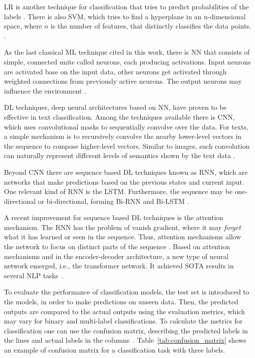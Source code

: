 \gls{LR} is another technique for classification that tries to predict probabilities of the labels \cite{Morgan1988}. There is also \gls{SVM}, which tries to find a hyperplane in an n-dimensional space, where $n$ is the number of features, that distinctly classifies the data points.
\cite{Cortes1995}. 

As the last classical \gls{ML} technique cited in this work, there is \gls{NN} that consists of simple, connected units called neurons, each producing activations. Input neurons are activated base on the input data, other neurons get activated through weighted connections from previously active neurons. The output neurons may influence the environment  \cite{Schmidhuber2015}. 

\gls{DL} techniques, deep neural architectures based on \gls{NN}, have proven to be effective in text classification. Among the techniques available there is \gls{CNN}, which uses convolutional masks to sequentially convolve over the data. For texts, a simple mechanism is to recursively convolve the nearby lower-level vectors in the sequence to compose higher-level vectors. Similar to images, such convolution can naturally represent different levels of semantics shown by the text data \cite{Peng2018}. 

Beyond \gls{CNN} there are sequence based \gls{DL} techniques known as \gls{RNN}, which are networks that make predictions based on the previous states and current input. One relevant kind of \gls{RNN} is the  \gls{LSTM}. Furthermore, the sequence may be one-directional or bi-directional, forming Bi-RNN and Bi-LSTM \cite{Kowsari2019, Hochreiter1997}. 

A recent improvement for sequence based \gls{DL} techniques is the attention mechanism. The \gls{RNN} has the problem of vanish gradient, where it may \textit{forget} what it has learned or seen in the sequence. Thus, attention mechanisms allow the network to focus on distinct parts of the sequence  \cite{Schmidhuber2015}. 
Based on attention mechanisms and in the encoder-decoder architecture, a new type of neural network emerged, i.e., the transformer network. It achieved \gls{SOTA} results in several \gls{NLP} tasks~\cite{Vaswani2017}.

To evaluate the performance of classification models,  the test set is introduced to the models, in order to make  predictions on  unseen data. Then, the predicted outputs are compared to the actual outputs using the evaluation metrics, which may vary for binary and multi-label classifications. To calculate the metrics for classification one can use the confusion matrix, describing the predicted labels in the lines and actual labels in the columns~\cite{Kowsari2019}. Table~\ref{tab:confusion_matrix} shows an example of confusion matrix for a classification task with three labels.

